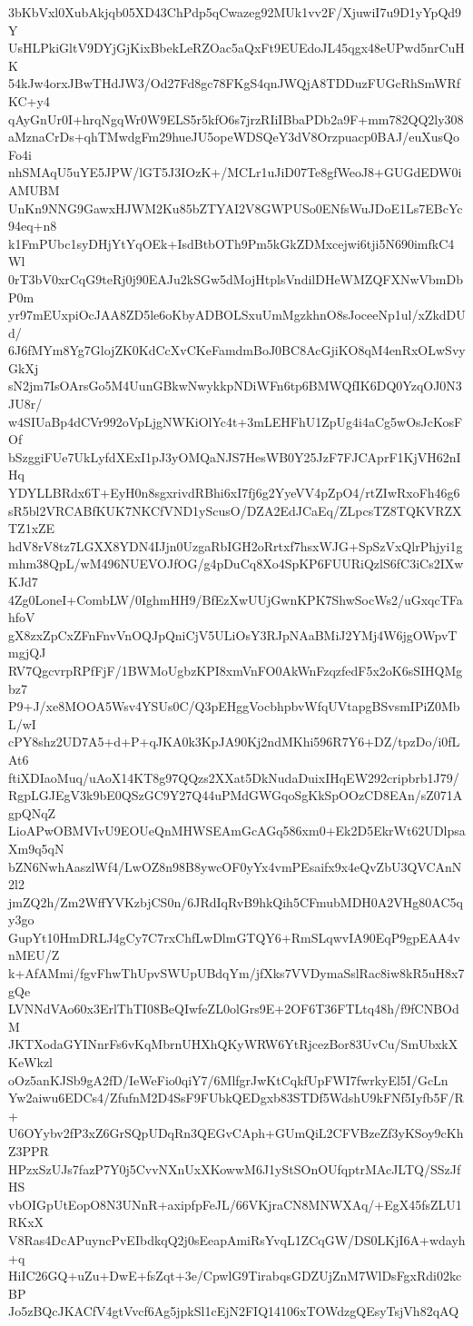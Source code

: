 3bKbVxl0XubAkjqb05XD43ChPdp5qCwazeg92MUk1vv2F/XjuwiI7u9D1yYpQd9Y
UsHLPkiGltV9DYjGjKixBbekLeRZOac5aQxFt9EUEdoJL45qgx48eUPwd5nrCuHK
54kJw4orxJBwTHdJW3/Od27Fd8gc78FKgS4qnJWQjA8TDDuzFUGcRhSmWRfKC+y4
qAyGnUr0I+hrqNgqWr0W9ELS5r5kfO6s7jrzRIiIBbaPDb2a9F+mm782QQ2ly308
aMznaCrDs+qhTMwdgFm29hueJU5opeWDSQeY3dV8Orzpuacp0BAJ/euXusQoFo4i
nhSMAqU5uYE5JPW/lGT5J3IOzK+/MCLr1uJiD07Te8gfWeoJ8+GUGdEDW0iAMUBM
UnKn9NNG9GawxHJWM2Ku85bZTYAI2V8GWPUSo0ENfsWuJDoE1Ls7EBcYc94eq+n8
k1FmPUbc1syDHjYtYqOEk+IsdBtbOTh9Pm5kGkZDMxcejwi6tji5N690imfkC4Wl
0rT3bV0xrCqG9teRj0j90EAJu2kSGw5dMojHtplsVndilDHeWMZQFXNwVbmDbP0m
yr97mEUxpiOcJAA8ZD5le6oKbyADBOLSxuUmMgzkhnO8sJoceeNp1ul/xZkdDUd/
6J6fMYm8Yg7GlojZK0KdCcXvCKeFamdmBoJ0BC8AcGjiKO8qM4enRxOLwSvyGkXj
sN2jm7IsOArsGo5M4UunGBkwNwykkpNDiWFn6tp6BMWQfIK6DQ0YzqOJ0N3JU8r/
w4SIUaBp4dCVr992oVpLjgNWKiOlYc4t+3mLEHFhU1ZpUg4i4aCg5wOsJcKosFOf
bSzggiFUe7UkLyfdXExI1pJ3yOMQaNJS7HesWB0Y25JzF7FJCAprF1KjVH62nIHq
YDYLLBRdx6T+EyH0n8sgxrivdRBhi6xI7fj6g2YyeVV4pZpO4/rtZIwRxoFh46g6
sR5bl2VRCABfKUK7NKCfVND1yScusO/DZA2EdJCaEq/ZLpcsTZ8TQKVRZXTZ1xZE
hdV8rV8tz7LGXX8YDN4IJjn0UzgaRbIGH2oRrtxf7hsxWJG+SpSzVxQlrPhjyi1g
mhm38QpL/wM496NUEVOJfOG/g4pDuCq8Xo4SpKP6FUURiQzlS6fC3iCs2IXwKJd7
4Zg0LoneI+CombLW/0IghmHH9/BfEzXwUUjGwnKPK7ShwSocWs2/uGxqcTFahfoV
gX8zxZpCxZFnFnvVnOQJpQniCjV5ULiOsY3RJpNAaBMiJ2YMj4W6jgOWpvTmgjQJ
RV7QgcvrpRPfFjF/1BWMoUgbzKPI8xmVnFO0AkWnFzqzfedF5x2oK6sSIHQMgbz7
P9+J/xe8MOOA5Wsv4YSUs0C/Q3pEHggVocbhpbvWfqUVtapgBSvsmIPiZ0MbL/wI
cPY8shz2UD7A5+d+P+qJKA0k3KpJA90Kj2ndMKhi596R7Y6+DZ/tpzDo/i0fLAt6
ftiXDIaoMuq/uAoX14KT8g97QQzs2XXat5DkNudaDuixIHqEW292cripbrb1J79/
RgpLGJEgV3k9bE0QSzGC9Y27Q44uPMdGWGqoSgKkSpOOzCD8EAn/sZ071AgpQNqZ
LioAPwOBMVIvU9EOUeQnMHWSEAmGcAGq586xm0+Ek2D5EkrWt62UDlpsaXm9q5qN
bZN6NwhAaszlWf4/LwOZ8n98B8ywcOF0yYx4vmPEsaifx9x4eQvZbU3QVCAnN2l2
jmZQ2h/Zm2WffYVKzbjCS0n/6JRdIqRvB9hkQih5CFmubMDH0A2VHg80AC5qy3go
GupYt10HmDRLJ4gCy7C7rxChfLwDlmGTQY6+RmSLqwvIA90EqP9gpEAA4vnMEU/Z
k+AfAMmi/fgvFhwThUpvSWUpUBdqYm/jfXks7VVDymaSslRac8iw8kR5uH8x7gQe
LVNNdVAo60x3ErlThTI08BeQIwfeZL0olGrs9E+2OF6T36FTLtq48h/f9fCNBOdM
JKTXodaGYINnrFs6vKqMbrnUHXhQKyWRW6YtRjcezBor83UvCu/SmUbxkXKeWkzl
oOz5anKJSb9gA2fD/IeWeFio0qiY7/6MlfgrJwKtCqkfUpFWI7fwrkyEl5I/GcLn
Yw2aiwu6EDCs4/ZfufnM2D4SsF9FUbkQEDgxb83STDf5WdshU9kFNf5Iyfb5F/R+
U6OYybv2fP3xZ6GrSQpUDqRn3QEGvCAph+GUmQiL2CFVBzeZf3yKSoy9cKhZ3PPR
HPzxSzUJs7fazP7Y0j5CvvNXnUxXKowwM6J1yStSOnOUfqptrMAcJLTQ/SSzJfHS
vbOIGpUtEopO8N3UNnR+axipfpFeJL/66VKjraCN8MNWXAq/+EgX45fsZLU1RKxX
V8Ras4DcAPuyncPvEIbdkqQ2j0sEeapAmiRsYvqL1ZCqGW/DS0LKjI6A+wdayh+q
HiIC26GQ+uZu+DwE+fsZqt+3e/CpwlG9TirabqsGDZUjZnM7WlDsFgxRdi02kcBP
Jo5zBQcJKACfV4gtVvcf6Ag5jpkSl1cEjN2FIQ14106xTOWdzgQEsyTsjVh82qAQ
